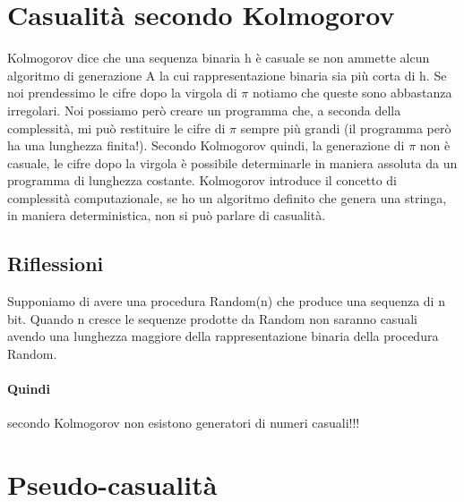 \section{Casualità secondo Kolmogorov}
Kolmogorov dice che una sequenza binaria h è casuale se non ammette alcun algoritmo di generazione A la cui rappresentazione binaria sia più corta di h.
Se noi prendessimo le cifre dopo la virgola di $\pi$ notiamo che queste sono abbastanza irregolari. Noi possiamo però creare un programma che, a seconda della complessità, mi può restituire le cifre di $\pi$ sempre più grandi (il programma però ha una lunghezza finita!). Secondo Kolmogorov quindi, la generazione di $\pi$ non è casuale, le cifre dopo la virgola è possibile determinarle in maniera assoluta da un programma di lunghezza costante. Kolmogorov introduce il concetto di complessità computazionale, se ho un algoritmo definito che genera una stringa, in maniera deterministica, non si può parlare di casualità.

\subsection{Riflessioni}

Supponiamo di avere una procedura Random(n) che produce una sequenza di n bit. Quando n cresce le sequenze prodotte da Random non saranno casuali avendo una lunghezza maggiore della rappresentazione binaria della procedura Random. 

\paragraph{Quindi} secondo Kolmogorov non esistono generatori di
numeri casuali!!!

\section{Pseudo-casualità}

